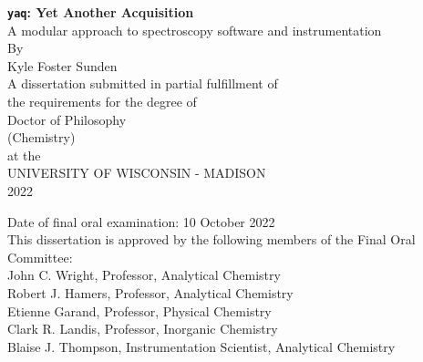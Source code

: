 \documentclass{dissertation}
\begin{document}
\raggedbottom


\begin{centering}
\thispagestyle{empty}


\textbf{\texttt{yaq}: Yet Another Acquisition} \\
A modular approach to spectroscopy software and instrumentation \\
\vspace{80 pt}
By \\
Kyle Foster Sunden \\
\vspace{40 pt}
A dissertation submitted in partial fulfillment of \\
the requirements for the degree of \\
\vspace{10 pt}
Doctor of Philosophy \\ (Chemistry) \\
\vspace{40 pt}
at the \\
UNIVERSITY OF WISCONSIN - MADISON \\
2022 \\
\end{centering}

\vfill

\noindent Date of final oral examination: 10 October 2022 \\
This dissertation is approved by the following members of the Final Oral Committee: \\
\-\hspace{1cm} John C. Wright, Professor, Analytical Chemistry \\
\-\hspace{1cm} Robert J. Hamers, Professor, Analytical Chemistry \\
\-\hspace{1cm} Etienne Garand, Professor, Physical Chemistry \\
\-\hspace{1cm} Clark R. Landis, Professor, Inorganic Chemistry \\
\-\hspace{1cm} Blaise J. Thompson, Instrumentation Scientist, Analytical Chemistry \\

\cleardoublepage  %
\end{document}
